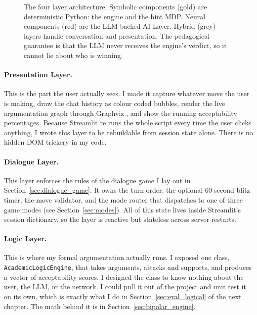\begin{figure}[h]
\caption{The four layer architecture. Symbolic components (gold) are deterministic Python: the engine and the hint MDP. Neural components (red) are the LLM-backed AI Layer. Hybrid (grey) layers handle conversation and presentation. The pedagogical guarantee is that the LLM never receives the engine's verdict, so it cannot lie about who is winning.}
\label{fig:layered_arch}
\end{figure}

\paragraph{Presentation Layer.}
This is the part the user actually sees. I made it capture whatever move the user is making, draw the chat history as colour coded bubbles, render the live argumentation graph through Graphviz \cite{ellson2002graphviz}, and show the running acceptability percentages. Because Streamlit \cite{streamlit2024} re runs the whole script every time the user clicks anything, I wrote this layer to be rebuildable from session state alone. There is no hidden DOM trickery in my code.

\paragraph{Dialogue Layer.}
This layer enforces the rules of the dialogue game I lay out in Section~\ref{sec:dialogue_game}. It owns the turn order, the optional 60 second blitz timer, the move validator, and the mode router that dispatches to one of three game modes (see Section~\ref{sec:modes}). All of this state lives inside Streamlit's session dictionary, so the layer is reactive but stateless across server restarts.

\paragraph{Logic Layer.}
This is where my formal argumentation actually runs. I exposed one class, \texttt{AcademicLogicEngine}, that takes arguments, attacks and supports, and produces a vector of acceptability scores. I designed the class to know nothing about the user, the LLM, or the network. I could pull it out of the project and unit test it on its own, which is exactly what I do in Section~\ref{sec:eval_logical} of the next chapter. The math behind it is in Section~\ref{sec:bipolar_engine}.

